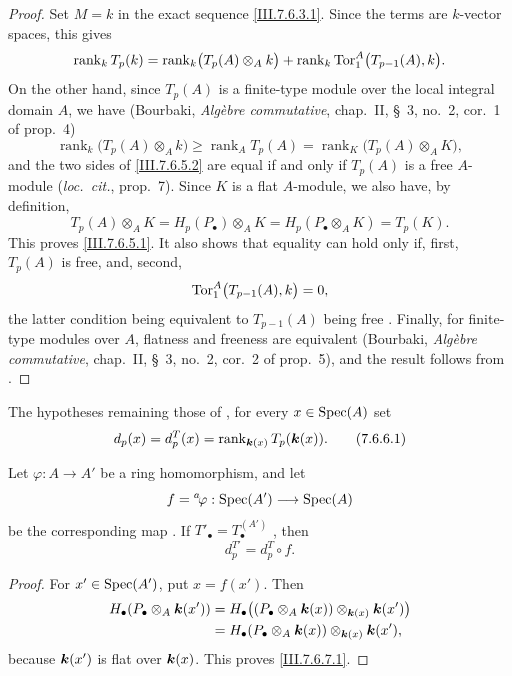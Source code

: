 \begin{proof}
Set $M=k$ in the exact sequence \eqref{III.7.6.3.1}.  Since
the terms are $k$-vector spaces, this gives
\[
  \operatorname{rank}_k T_p(k)
  =
  \operatorname{rank}_k\bigl(T_p(A)\otimes_A k\bigr)
  +
  \operatorname{rank}_k
  \operatorname{Tor}_1^A\bigl(T_{p-1}(A),k\bigr).
\]
On the other hand, since $T_p(A)$ is a finite-type module
over the local integral domain $A$, we have (Bourbaki,
\emph{Alg\`ebre commutative}, chap.~II, \S~3, no.~2,
cor.~1 of prop.~4)
\[
  \operatorname{rank}_k\bigl(T_p(A)\otimes_A k\bigr)
  \geq
  \operatorname{rank}_A T_p(A)
  =
  \operatorname{rank}_K\bigl(T_p(A)\otimes_A K\bigr),
  \tag{7.6.5.2}\label{III.7.6.5.2}
\]
and the two sides of \eqref{III.7.6.5.2} are equal if and
only if $T_p(A)$ is a free $A$-module (\emph{loc.\ cit.},
prop.~7).  Since $K$ is a flat $A$-module, we also have, by
definition,
\[
  T_p(A)\otimes_A K
  =
  H_p(P_\bullet)\otimes_A K
  =
  H_p(P_\bullet\otimes_A K)
  =
  T_p(K).
\]
This proves \eqref{III.7.6.5.1}.  It also shows that equality
can hold only if, first, $T_p(A)$ is free, and, second,
\[
  \operatorname{Tor}_1^A\bigl(T_{p-1}(A),k\bigr)=0,
\]
the latter condition being equivalent to $T_{p-1}(A)$ being
free .  Finally, for finite-type modules
over $A$, flatness and freeness are equivalent (Bourbaki,
\emph{Alg\`ebre commutative}, chap.~II, \S~3, no.~2,
cor.~2 of prop.~5), and the result follows from
.
\end{proof}

\begin{env}[7.6.6]
\label{III.7.6.6}
The hypotheses remaining those of , for
every $x\in\operatorname{Spec}(A)$ set
\[
  d_p(x)=d_p^T(x)
  =
  \operatorname{rank}_{\boldsymbol{k}(x)}T_p(\boldsymbol{k}(x)).
  \tag{7.6.6.1}\label{III.7.6.6.1}
\]
\end{env}

\begin{lemma}[7.6.7]
\label{III.7.6.7}
Let $\varphi:A\to A'$ be a ring homomorphism, and let
\[
  f={}^a\!\varphi:\operatorname{Spec}(A')\longrightarrow\operatorname{Spec}(A)
\]
be the corresponding map .  If
$T'_\bullet=T_\bullet^{(A')}$ , then
\[
  d_p^{T'}=d_p^T\circ f.
  \tag{7.6.7.1}\label{III.7.6.7.1}
\]
\end{lemma}

\begin{proof}
For $x'\in\operatorname{Spec}(A')$, put $x=f(x')$.  Then
\begin{align*}
  H_\bullet(P_\bullet\otimes_A\boldsymbol{k}(x'))
  &=
  H_\bullet\bigl(
    (P_\bullet\otimes_A\boldsymbol{k}(x))
    \otimes_{\boldsymbol{k}(x)}\boldsymbol{k}(x')
  \bigr)\\
  &=
  H_\bullet(P_\bullet\otimes_A\boldsymbol{k}(x))
  \otimes_{\boldsymbol{k}(x)}\boldsymbol{k}(x'),
\end{align*}
because $\boldsymbol{k}(x')$ is flat over $\boldsymbol{k}(x)$.  This proves
\eqref{III.7.6.7.1}.
\end{proof}


